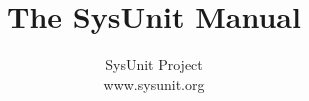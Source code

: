 \documentclass[10pt,letterpaper]{book}
\begin{document}
\let\footnoterule\hrule

\makeatletter
\renewcommand{\@makefntext}[1]%
	{\noindent\makebox[1.8em][r]{\@makefnmark}#1}
\makeatother

\title{
	The SysUnit Manual
}

\author{
	\textsf{SysUnit Project}\\
	\textsf{www.sysunit.org}\\
}


\frontmatter

\maketitle

\tableofcontents

\listoffigures 


\mainmatter



\appendix




\backmatter


\small
\printindex
\end{document}
